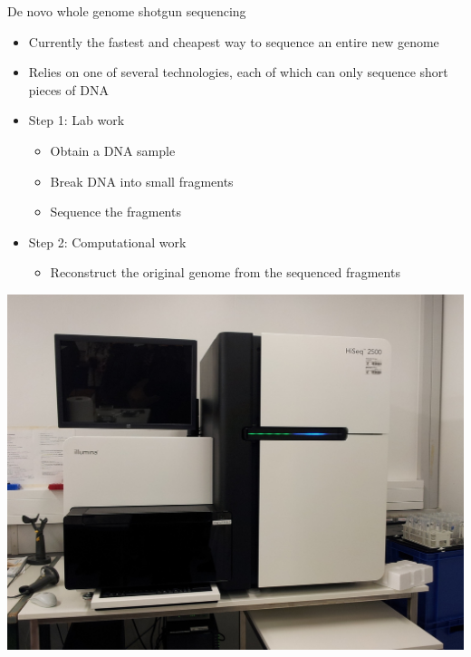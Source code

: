 \documentclass[xcolor=dvipsnames]{beamer}
\begin{document}
\begin{frame}{De novo whole genome shotgun sequencing}
    \begin{minipage}{0.66\textwidth}
        \begin{itemize}
            \item Currently the fastest and cheapest way to sequence an entire
                  new genome
            \item Relies on one of several technologies, each of which can only
                sequence short pieces of DNA
            \item Step 1: Lab work
                \begin{itemize}
                    \item Obtain a DNA sample
                    \item Break DNA into small fragments
                    \item Sequence the fragments
                \end{itemize}
            \item Step 2: Computational work
                \begin{itemize}
                    \item Reconstruct the original genome from the sequenced
                          fragments
                \end{itemize}
        \end{itemize}
    \end{minipage}
    \begin{minipage}{0.32\textwidth}
        \begin{center}
            \includegraphics[width=1.0\textwidth]{Illumina_HiSeq_2500.jpg} \\

\end{center}
\end{minipage}
\end{frame}
\end{document}
